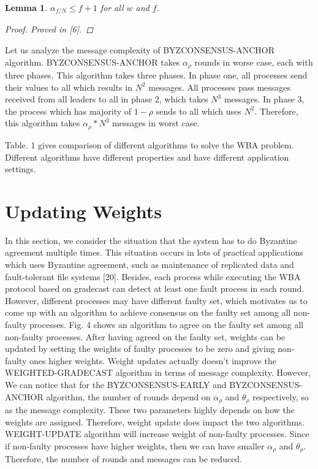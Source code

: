 \documentclass[conference]{IEEEtran}
\newtheorem{l1}{Lemma}
\begin{document}
\begin{l1}
$\alpha_{f/N} \leq f + 1$ for all $w$ and $f$.
\begin{proof}
Proved in [6].
\end{proof}
\end{l1}

Let us analyze the message complexity of BYZCONSENSUS-ANCHOR algorithm. BYZCONSENSUS-ANCHOR takes $\alpha_\rho$ rounds in worse case, each with three phases.  This algorithm takes three phases. In phase one, all processes send their values to all which results in $N^2$ messages. All processes pass messages received from all leaders to all in phase 2, which takes $N^3$ messages. In phase 3, the process which has majority of $1 - \rho$ sends to all which uses $N^2$. Therefore, this algorithm takes  $\alpha_\rho*N^3$ messages in worst case. 

Table. 1 gives comparison of different algorithms to solve the WBA problem. Different algorithms have different properties and have different application settings. 

\section{Updating Weights}

In this section, we consider the situation that the system has to do Byzantine agreement multiple times. This situation occurs in lots of practical applications which uses Byzantine agreement,  such as maintenance of replicated data and fault-tolerant file systems [20]. Besides, each process while executing the WBA protocol based on gradecast can detect at least one fault process in each round. However, different processes may have different faulty set, which motivates us to come up with an algorithm to achieve consensus on the faulty set among all non-faulty processes. Fig. 4 shows an algorithm to agree on the faulty set among all non-faulty processes. After having agreed on the faulty set, weights can be updated by setting the weights of faulty processes to be zero and giving non-faulty ones higher weights. Weight updates actually doesn't improve the WEIGHTED-GRADECAST algorithm in terms of message complexity. However,  We can notice that for the BYZCONSENSUS-EARLY and BYZCONSENSUS-ANCHOR algorithm, the number of rounds depend on $\alpha_\rho$ and $\theta_\rho$ respectively, so as the message complexity. These two parameters highly depends on how the weights are assigned. Therefore, weight update does impact the two algorithms. WEIGHT-UPDATE algorithm will increase weight of non-faulty processes. Since if non-faulty processes have higher weights, then we can have smaller $\alpha_\rho$ and $\theta_\rho$. Therefore,  the number of rounds and messages can be reduced.
\end{document}
